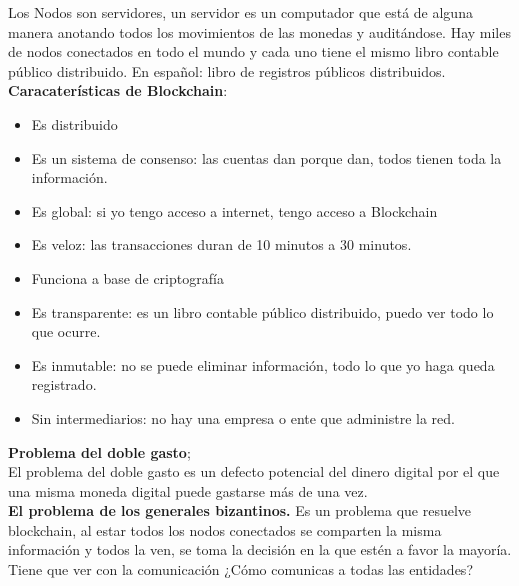 \documentclass[a4paper,12pt]{lib/pub}
\begin{document}
Los Nodos son servidores, un servidor es un computador que está de alguna manera anotando todos los movimientos de las monedas y auditándose. Hay miles de nodos conectados en todo el mundo y cada uno tiene el mismo libro contable público distribuido. En español: libro de registros públicos distribuidos.\\
\textbf{Caracaterísticas de Blockchain}:
\begin{itemize}	
	\item Es distribuido
	\item Es un sistema de consenso: las cuentas dan porque dan, todos tienen toda la información.
	\item Es global: si yo tengo acceso a internet, tengo acceso a Blockchain
	\item Es veloz: las transacciones duran de 10 minutos a 30 minutos.
	\item Funciona a base de criptografía
	\item Es transparente: es un libro contable público distribuido, puedo ver todo lo que ocurre.
	\item Es inmutable: no se puede eliminar información, todo lo que yo haga queda registrado.
	\item Sin intermediarios: no hay una empresa o ente que administre la red.
\end{itemize}
\textbf{Problema del doble gasto};\\
El problema del doble gasto es un defecto potencial del dinero digital por el que una misma moneda digital puede gastarse más de una vez.\\
\textbf{El problema de los generales bizantinos.}
Es un problema que resuelve blockchain, al estar todos los nodos conectados se comparten la misma información y todos la ven, se toma la decisión en la que estén a favor la mayoría. Tiene que ver con la comunicación ¿Cómo comunicas a todas las entidades?
\end{document}
